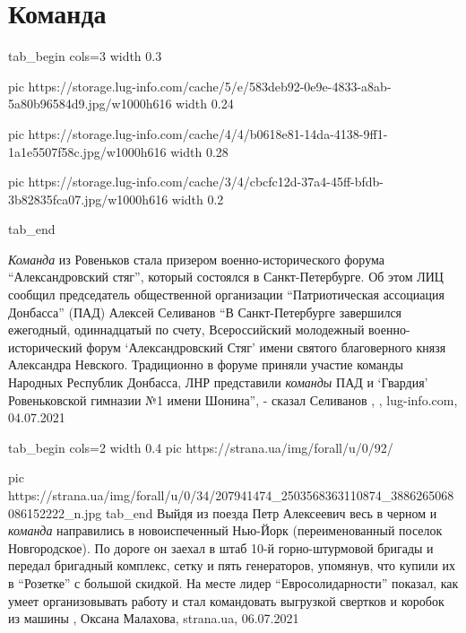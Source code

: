  
 
 
 
 
\chapter{Команда}
\label{sec:slova.komanda}


\ifcmt
  tab_begin cols=3
   	 width 0.3

     pic https://storage.lug-info.com/cache/5/e/583deb92-0e9e-4833-a8ab-5a80b96584d9.jpg/w1000h616
		 width 0.24

     pic https://storage.lug-info.com/cache/4/4/b0618e81-14da-4138-9ff1-1a1e5507f58c.jpg/w1000h616
		 width 0.28

		 pic https://storage.lug-info.com/cache/3/4/cbcfc12d-37a4-45ff-bfdb-3b82835fca07.jpg/w1000h616
		 width 0.2

  tab_end
\fi

\emph{Команда} из Ровеньков стала призером военно-исторического форума
\enquote{Александровский стяг}, который состоялся в Санкт-Петербурге. Об этом
ЛИЦ сообщил председатель общественной организации \enquote{Патриотическая
ассоциация Донбасса} (ПАД) Алексей Селиванов \enquote{В Санкт-Петербурге
завершился ежегодный, одиннадцатый по счету, Всероссийский молодежный
военно-исторический форум \enquote{Александровский Стяг} имени святого
благоверного князя Александра Невского. Традиционно в форуме приняли участие
команды Народных Республик Донбасса, ЛНР представили \emph{команды} ПАД и
\enquote{Гвардия} Ровеньковской гимназии №1 имени Шонина}, - сказал Селиванов
, , lug-info.com,
04.07.2021

\ifcmt
tab_begin cols=2
	width 0.4
  pic https://strana.ua/img/forall/u/0/92/%

	pic https://strana.ua/img/forall/u/0/34/207941474_2503568363110874_3886265068086152222_n.jpg
tab_end
\fi
Выйдя из поезда Петр Алексеевич весь в черном и \emph{команда} направились в
новоиспеченный Нью-Йорк (переименованный поселок Новгородское). По дороге он
заехал в штаб 10-й горно-штурмовой бригады и передал бригадный комплекс, сетку
и пять генераторов, упомянув, что купили их в \enquote{Розетке} с большой скидкой.  На
месте лидер \enquote{Евросолидарности} показал, как умеет организовывать работу и стал
командовать выгрузкой свертков и коробок из машины
, 
Оксана Малахова, strana.ua, 06.07.2021

